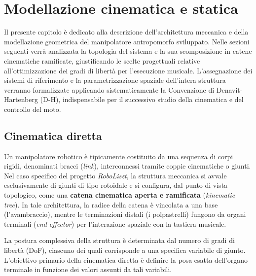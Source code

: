 
\chapter{Modellazione cinematica e statica}

Il presente capitolo è dedicato alla descrizione dell'architettura meccanica e della modellazione geometrica del manipolatore antropomorfo sviluppato. 
Nelle sezioni seguenti verrà analizzata la topologia del sistema e la sua scomposizione in catene cinematiche ramificate, giustificando le scelte progettuali relative all'ottimizzazione dei gradi di libertà per l'esecuzione musicale. 
L'assegnazione dei sistemi di riferimento e la parametrizzazione spaziale dell'intera struttura verranno formalizzate applicando sistematicamente la Convenzione di Denavit-Hartenberg (D-H), indispensabile per il successivo studio della cinematica e del controllo del moto.

\section{Cinematica diretta}

Un manipolatore robotico è tipicamente costituito da una sequenza di corpi rigidi, denominati bracci (\textit{link}), interconnessi tramite coppie cinematiche o giunti. 
Nel caso specifico del progetto \textit{RoboLiszt}, la struttura meccanica si avvale esclusivamente di giunti di tipo rotoidale e si configura, dal punto di vista topologico, come una \textbf{catena cinematica aperta e ramificata} (\textit{kinematic tree}). 
In tale architettura, la radice della catena è vincolata a una base (l'avambraccio), mentre le terminazioni distali (i polpastrelli) fungono da organi terminali (\textit{end-effector}) per l'interazione spaziale con la tastiera musicale.

La postura complessiva della struttura è determinata dal numero di gradi di libertà (DoF), ciascuno dei quali corrisponde a una specifica variabile di giunto. 
L'obiettivo primario della cinematica diretta è definire la posa esatta dell'organo terminale in funzione dei valori assunti da tali variabili.

